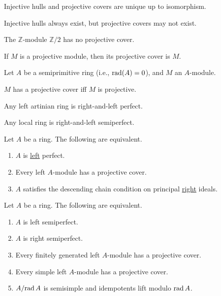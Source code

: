 \documentclass[12pt]{article}
\begin{document}
\begin{thm}
	Injective hulls and projective covers are unique up to isomorphism.

	Injective hulls always exist, but projective covers may not exist.
\end{thm}
\begin{ex}
	The $\mathbb{Z}$-module $\mathbb{Z}/2$ has no projective cover.
\end{ex}

\begin{thm}
	If $M$ is a projective module, then its projective cover is $M$.
\end{thm}

\begin{thm}
	Let $A$ be a semiprimitive ring (i.e., $\operatorname{rad}(A) = 0$), and $M$ an $A$-module. 

	$M$ has a projective cover iff $M$ is projective.
\end{thm}

\begin{thm}
	Any left artinian ring is right-and-left perfect. 

	Any local ring is right-and-left semiperfect.
\end{thm}

\begin{thm}
	Let $A$ be a ring. The following are equivalent.
	\begin{enumerate}[label=(\alph*)]
		\item $A$ is \underline{left} perfect.
		\item Every left $A$-module has a projective cover. 
		\item $A$ satisfies the descending chain condition on principal \underline{right} ideals.
	\end{enumerate}
\end{thm}

\begin{thm}
	Let $A$ be a ring. The following are equivalent.
	\begin{enumerate}[label=(\alph*)]
		\item $A$ is left semiperfect.
		\item $A$ is right semiperfect.
		\item Every finitely generated left $A$-module has a projective cover. 
		\item Every simple left $A$-module has a projective cover. 
		\item $A/{\operatorname{rad} A}$ is semisimple and idempotents lift modulo $\operatorname{rad} A$.
	\end{enumerate}
\end{thm}
\end{document}
